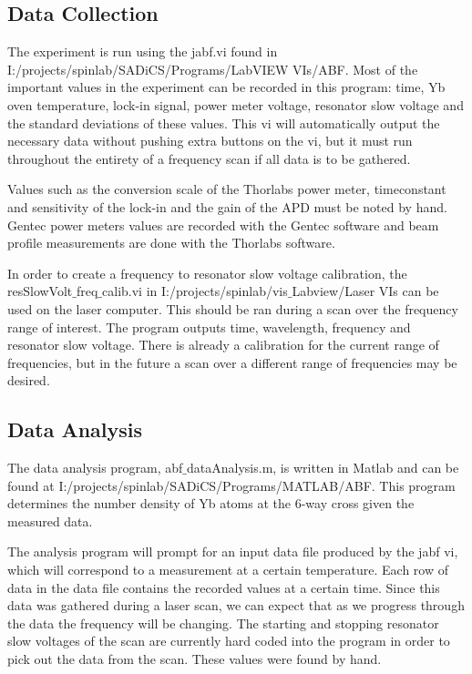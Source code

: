 \documentclass[12pt, a4paper]{article}
\begin{document}
\subsection{Data Collection}
The experiment is run using the jabf.vi found in \footnotesize I:/projects/spinlab/SADiCS/Programs/LabVIEW VIs/ABF. \normalsize Most of the important values in the experiment can be recorded in this program: time, Yb oven temperature, lock-in signal, power meter voltage, resonator slow voltage and the standard deviations of these values. This vi will automatically output the necessary data without pushing extra buttons on the vi, but it must run throughout the entirety of a frequency scan if all data is to be gathered. 

Values such as the conversion scale of the Thorlabs power meter, timeconstant and sensitivity of the lock-in and the gain of the APD must be noted by hand. Gentec power meters values are recorded with the Gentec software and beam profile measurements are done with the Thorlabs software.

In order to create a frequency to resonator slow voltage calibration, the \\resSlowVolt$\_$freq$\_$calib.vi in \footnotesize I:/projects/spinlab/vis$\_$Labview/Laser VIs \normalsize can be used on the laser computer. This should be ran during a scan over the frequency range of interest. The program outputs time, wavelength, frequency and resonator slow voltage. There is already a calibration for the current range of frequencies, but in the future a scan over a different range of frequencies may be desired.

\subsection{Data Analysis}
The data analysis program, abf$\_$dataAnalysis.m,  is written in Matlab and can be found at \footnotesize I:/projects/spinlab/SADiCS/Programs/MATLAB/ABF. \normalsize This program determines the number density of Yb atoms at the 6-way cross given the measured data.

The analysis program will prompt for an input data file produced by the jabf vi, which will correspond to a measurement at a certain temperature. Each row of data in the data file contains the recorded values at a certain time. Since this data was gathered during a laser scan, we can expect that as we progress through the data the frequency will be changing. The starting and stopping resonator slow voltages of the scan are currently hard coded into the program in order to pick out the data from the scan. These values were found by hand. 
\end{document}

